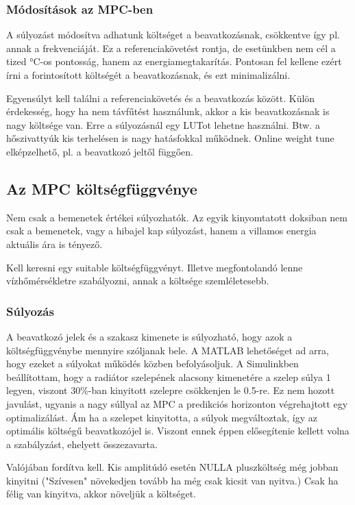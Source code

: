 \subsubsection{Módosítások az MPC-ben}

A súlyozást módosítva adhatunk költséget a beavatkozásnak, csökkentve így pl. annak a frekvenciáját. Ez a referenciakövetést rontja, de esetünkben nem cél a tized \si{\celsius}-os pontosság, hanem az energiamegtakarítás.
Pontosan fel kellene ezért írni a forintosított költségét a beavatkozásnak, és ezt minimalizálni.

Egyensúlyt kell találni a referenciakövetés és a beavatkozás között. Külön érdekesség, hogy ha nem távfűtést használunk, akkor a kis beavatkozásnak is nagy költsége van. Erre a súlyozásnál egy LUTot lehetne használni. Btw. a hőszivattyúk kis terhelésen is nagy hatásfokkal működnek. Online weight tune elképzelhető, pl. a beavatkozó jeltől függően.

\subsection{Az MPC költségfüggvénye}




Nem csak a bemenetek értékei súlyozhatók. Az egyik kinyomtatott doksiban nem csak a bemenetek, vagy a hibajel kap súlyozást, hanem a villamos energia aktuális ára is tényező.

Kell keresni egy suitable költségfüggvényt. Illetve megfontolandó lenne vízhőmérsékletre szabályozni, annak a költsége szemléletesebb.

\subsubsection{Súlyozás}
A beavatkozó jelek és a szakasz kimenete is súlyozható, hogy azok a költségfüggvénybe mennyire szóljanak bele. A MATLAB lehetőséget ad arra, hogy ezeket a súlyokat működés közben befolyásoljuk. A Simulinkben beállítottam, hogy a radiátor szelepének alacsony kimenetére a szelep súlya 1 legyen, viszont 30\%-ban kinyitott szelepre csökkenjen le 0.5-re. Ez nem hozott javulást, ugyanis a nagy súllyal az MPC a predikciós horizonton végrehajtott egy optimalizálást. Ám ha a szelepet kinyitotta, a súlyok megváltoztak, így az optimális költségű beavatkozójel is. Viszont ennek éppen elősegítenie kellett volna a szabályzást, ehelyett összezavarta.


Valójában fordítva kell. Kis amplitúdó esetén NULLA pluszköltség még jobban kinyitni ("Szívesen" növekedjen tovább ha még csak kicsit van nyitva.) Csak ha félig van kinyitva, akkor növeljük a költséget.

